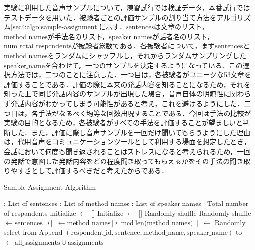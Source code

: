 \documentclass[12pt]{jarticle}
\numberwithin{equation}{section}    %
\numberwithin{figure}{section}      %
\numberwithin{table}{section}      %
\begin{document}
実験に利用した音声サンプルについて，練習試行では検証データ，本番試行ではテストデータを用いた．被験者ごとの評価サンプルの割り当て方法をアルゴリズム\ref{sec4:algo:sample-assignment}に示す．$\text{sentences}$は文章のリスト，$\text{method\_names}$が手法名のリスト，$\text{speaker\_names}$が話者名のリスト，$\text{num\_total\_respondents}$が被験者総数である．各被験者について，まず$\text{sentences}$と$\text{method\_names}$をランダムにシャッフルし，それからランダムサンプリングした$\text{speaker\_name}$を合わせて，一つのサンプルを決定するようになっている．この選択方法では，二つのことに注意した．一つ目は，各被験者がユニークな53文章を評価することである．評価の際に本来の発話内容を知ることになるため，それを知った上で同じ発話内容のサンプルが出現した場合，音声自体の明瞭性に関わらず発話内容がわかってしまう可能性があると考え，これを避けるようにした．二つ目は，各手法がなるべく均等な回数出現することである．今回は手法の比較が実験の目的となるため，各被験者がすべての手法を評価することが望ましいと判断した．また，評価に際し音声サンプルを一回だけ聞いてもらうようにした理由は，代用音声をコミュニケーションツールとして利用する場面を想定したとき，会話において何度も聞き返されることはストレスになると考えられるため，一回の発話で意図した発話内容をどの程度聞き取ってもらえるかをその手法の聞き取りやすさとして評価するべきだと考えたからである．
\begin{algorithm}
    \caption{Sample Assignment Algorithm}
    \label{sec4:algo:sample-assignment}
    \begin{algorithmic}[1]
        \Require {}: List of sentences
        \Require {}: List of method names
        \Require {}: List of speaker names
        \Require {}: Total number of respondents
        \State Initialize  $\gets$ []
        \State Initialize  $\gets$ []
        \State Randomly shuffle 
        \State Randomly shuffle 
        \State {} $\gets \text{sentences}[i]$
        \State {} $\gets \text{method\_names}[i \bmod \text{len(method\_names)}]$
        \State {} $\gets$ Randomly select from 
        \State Append $(\text{respondent\_id}, \text{sentence}, \text{method\_name}, \text{speaker\_name})$ to 
        \EndFor
        \State {} $\gets \text{all\_assignments} \cup \text{assignments}$
        \EndFor
        \State \Return {}
    \end{algorithmic}
\end{algorithm}
\end{document}
